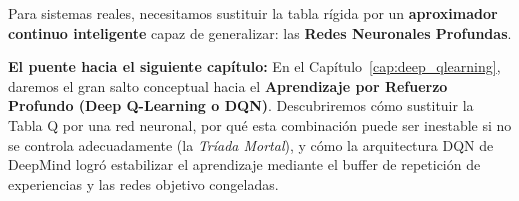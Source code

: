 Para sistemas reales, necesitamos sustituir la tabla rígida por un \textbf{aproximador continuo inteligente} capaz de generalizar: las \textbf{Redes Neuronales Profundas}.

\begin{notabox}
\textbf{El puente hacia el siguiente capítulo:} En el Capítulo~\ref{cap:deep_qlearning}, daremos el gran salto conceptual hacia el \textbf{Aprendizaje por Refuerzo Profundo (Deep Q-Learning o DQN)}. Descubriremos cómo sustituir la Tabla Q por una red neuronal, por qué esta combinación puede ser inestable si no se controla adecuadamente (la \textit{Tríada Mortal}), y cómo la arquitectura DQN de DeepMind logró estabilizar el aprendizaje mediante el buffer de repetición de experiencias y las redes objetivo congeladas.
\end{notabox}
